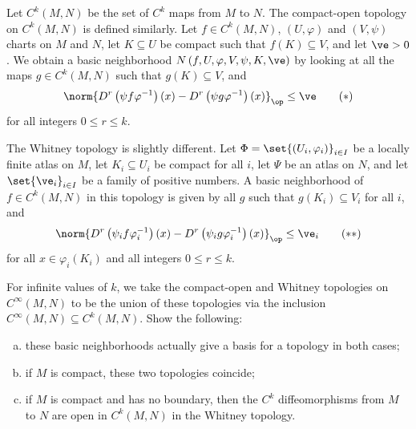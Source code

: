 \documentclass[10pt]{mypackage}
\begin{document}
\begin{problem}[Problem 8]
  Let $C^{k}\left( M,N \right)$ be the set of $C^{k}$ maps from $M$ to $N$. The compact-open topology on $C^{k}\left( M,N \right)$ is defined similarly. Let $f\in C^{k}\left( M,N \right)$, $\left( U,\varphi \right)$ and $\left( V,\psi \right)$ charts on $M$ and $N$, let $K\subseteq U$ be compact such that $f(K)\subseteq V$, and let $\ve > 0$. We obtain a basic neighborhood $N\left( f,U,\varphi,V,\psi,K,\ve \right)$ by looking at all the maps $g\in C^{k}\left( M,N \right)$ such that $g(K)\subseteq V$, and
  \begin{align*}
    \norm{D^{r}\left( \psi f \varphi^{-1} \right)\left( x \right) - D^{r}\left( \psi g \varphi^{-1} \right)\left( x \right)}_{\op} \leq \ve\label{eq:compact_open_manifolds}\tag{$\ast$}
  \end{align*}
  for all integers $0\leq r \leq k$.\newline

  The Whitney topology is slightly different. Let $\Phi = \set{\left( U_i,\varphi_i \right)}_{i\in I}$ be a locally finite atlas on $M$, let $K_i\subseteq U_i$ be compact for all $i$, let $\Psi$ be an atlas on $N$, and let $\set{\ve_i}_{i\in I}$ be a family of positive numbers. A basic neighborhood of $f\in C^{k}\left( M,N \right)$ in this topology is given by all $g$ such that $g\left( K_i \right)\subseteq V_i$ for all $i$, and
  \begin{align*}
    \norm{D^r\left( \psi_i f \varphi_i^{-1} \right)\left( x \right) - D^{r}\left( \psi_i g \varphi_i^{-1} \right)\left( x \right)}_{\op} \leq \ve_i\label{eq:whitney_manifolds}\tag{$\ast\ast$}
  \end{align*}
  for all $x\in \varphi_i\left( K_i \right)$ and all integers $0\leq r \leq k$.\newline

  For infinite values of $k$, we take the compact-open and Whitney topologies on $C^{\infty}\left( M,N \right)$ to be the union of these topologies via the inclusion $C^{\infty}\left( M,N \right)\subseteq C^{k}\left( M,N \right)$. Show the following:
  \begin{enumerate}[(a)]
    \item these basic neighborhoods actually give a basis for a topology in both cases;
    \item if $M$ is compact, these two topologies coincide;
    \item if $M$ is compact and has no boundary, then the $C^{k}$ diffeomorphisms from $M$ to $N$ are open in $C^{k}\left( M,N \right)$ in the Whitney topology.
  \end{enumerate}
\end{problem}
\end{document}

